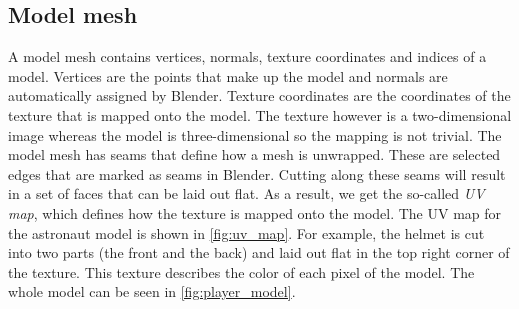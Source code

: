 \subsection{Model mesh} \label{sec:theory_theory_models_mesh}
A model mesh contains vertices, normals, texture coordinates and indices of a model.
Vertices are the points that make up the model and normals are automatically assigned by Blender.
Texture coordinates are the coordinates of the texture that is mapped onto the model.
The texture however is a two-dimensional image whereas the model is three-dimensional so the mapping is not trivial.
The model mesh has seams that define how a mesh is unwrapped.
These are selected edges that are marked as seams in Blender.
Cutting along these seams will result in a set of faces that can be laid out flat.
As a result, we get the so-called \textit{UV map}, which defines how the texture is mapped onto the model.
The UV map for the astronaut model is shown in \autoref{fig:uv_map}.
For example, the helmet is cut into two parts (the front and the back) and laid out flat in the top right corner of the texture.
This texture describes the color of each pixel of the model.
The whole model can be seen in \autoref{fig:player_model}.

